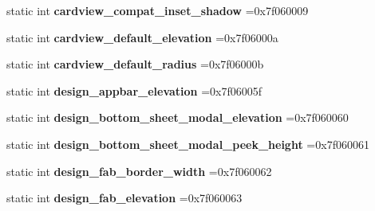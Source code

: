 \begin{DoxyCompactItemize}
static int {\bfseries cardview\+\_\+compat\+\_\+inset\+\_\+shadow} =0x7f060009
\item 
\mbox{\label{classandroid_1_1support_1_1graphics_1_1drawable_1_1animated_1_1R_1_1dimen_ae41b57156b10d54fc86b96cef64d668c}} 
static int {\bfseries cardview\+\_\+default\+\_\+elevation} =0x7f06000a
\item 
\mbox{\label{classandroid_1_1support_1_1graphics_1_1drawable_1_1animated_1_1R_1_1dimen_a06d0afa50e582d73255a3f88e44f35a7}} 
static int {\bfseries cardview\+\_\+default\+\_\+radius} =0x7f06000b
\item 
\mbox{\label{classandroid_1_1support_1_1graphics_1_1drawable_1_1animated_1_1R_1_1dimen_a08be89a6490e92d91156f79db21eeb5e}} 
static int {\bfseries design\+\_\+appbar\+\_\+elevation} =0x7f06005f
\item 
\mbox{\label{classandroid_1_1support_1_1graphics_1_1drawable_1_1animated_1_1R_1_1dimen_a1d6e84a16eaaee79c02202febbd8f9a2}} 
static int {\bfseries design\+\_\+bottom\+\_\+sheet\+\_\+modal\+\_\+elevation} =0x7f060060
\item 
\mbox{\label{classandroid_1_1support_1_1graphics_1_1drawable_1_1animated_1_1R_1_1dimen_a4821eb8f25e18b56d3dd423549bd3190}} 
static int {\bfseries design\+\_\+bottom\+\_\+sheet\+\_\+modal\+\_\+peek\+\_\+height} =0x7f060061
\item 
\mbox{\label{classandroid_1_1support_1_1graphics_1_1drawable_1_1animated_1_1R_1_1dimen_a46b840d76b7309873db346693ecb9b6e}} 
static int {\bfseries design\+\_\+fab\+\_\+border\+\_\+width} =0x7f060062
\item 
\mbox{\label{classandroid_1_1support_1_1graphics_1_1drawable_1_1animated_1_1R_1_1dimen_aaeb7fff7ea5842e33e426334a1f38777}} 
static int {\bfseries design\+\_\+fab\+\_\+elevation} =0x7f060063

\end{DoxyCompactItemize}
